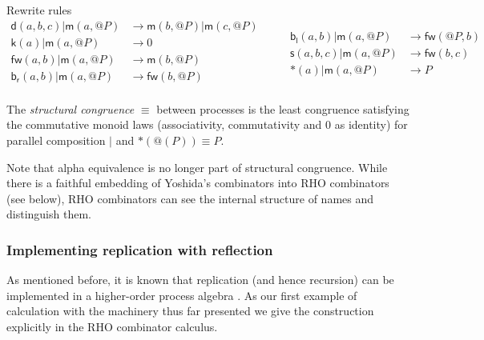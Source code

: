 \documentclass{llncs}
\makeatletter
\newcommand{\pzero}{\mathbin{0}}
\newcommand{\scong}{\mathbin{\equiv}}
\newcommand{\quotep}[1]{\mathsf{@}#1}
\newcommand{\red}{\rightarrow}
\makeatother
\begin{document}
Rewrite rules
\[\begin{array}{rl}
\mathsf{d}(a,b,c) | \mathsf{m}(a,\quotep{P}) & \red \mathsf{m}(b,\quotep{P}) | \mathsf{m}(c,\quotep{P}) \\
\mathsf{k}(a) | \mathsf{m}(a,\quotep{P}) & \red 0 \\
\mathsf{fw}(a,b) | \mathsf{m}(a,\quotep{P}) & \red \mathsf{m}(b,\quotep{P}) \\
\mathsf{b}_{\mathsf{r}}(a,b) | \mathsf{m}(a,\quotep{P}) & \red \mathsf{fw}(b,\quotep{P}) \\  
\end{array} \quad \quad
\begin{array}{rl}
  \mathsf{b}_{\mathsf{l}}(a,b) | \mathsf{m}(a,\quotep{P}) & \red \mathsf{fw}(\quotep{P},b) \\
  \mathsf{s}(a,b,c) | \mathsf{m}(a,\quotep{P}) & \red \mathsf{fw}(b,c) \\
  *(a) | \mathsf{m}(a,\quotep{P}) & \red P
\end{array}\]

\begin{definition}
  The {\em structural congruence} $\equiv$
  between processes \cite{SangiorgiWalker} is the least congruence
  satisfying the commutative monoid laws
  (associativity, commutativity and $\pzero$ as identity) for parallel
  composition $|$ and $*(@(P)) \equiv P$.
\end{definition}

Note that alpha equivalence is no longer part of structural
congruence.  While there is a faithful embedding of Yoshida's
combinators into RHO combinators (see below), RHO combinators can see
the internal structure of names and distinguish them.

\subsubsection{Implementing replication with reflection}

% 
% 
% 
% 
% 
As mentioned before, it is known that replication (and hence
recursion) can be implemented in a higher-order process algebra
\cite{SangiorgiWalker}. As our first example of calculation with the
machinery thus far presented we give the construction explicitly in
the RHO combinator calculus.
\end{document}
